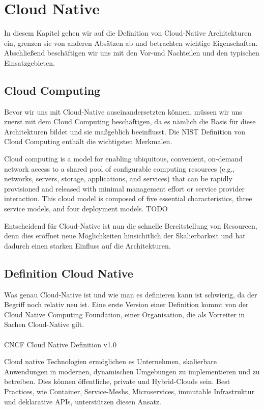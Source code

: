 \chapter{Cloud Native}

In diesem Kapitel gehen wir auf die Definition von Cloud-Native Architekturen ein, grenzen sie von anderen Absätzen ab und betrachten wichtige Eigenschaften. Abschließend beschäftigen wir uns mit den Vor-und Nachteilen und den typischen Einsatzgebieten.

\section{Cloud Computing}
Bevor wir uns mit Cloud-Native auseinandersetzten können, müssen wir uns zuerst mit dem Cloud Computing beschäftigen, da es nämlich die Basis für diese Architekturen bildet und sie maßgeblich beeinflusst. Die NIST Definition von Cloud Computing enthält die wichtigsten Merkmalen.

Cloud computing is a model for enabling ubiquitous, convenient, on-demand network access to a shared pool of configurable computing resources (e.g., networks, servers, storage, applications, and services) that can be rapidly provisioned and released with minimal management effort or service provider interaction. This cloud model is composed of five essential characteristics, three service models, and four deployment models. TODO

Entscheidend für Cloud-Native ist nun die schnelle Bereitstellung von Resourcen, denn dies eröffnet neue Möglichkeiten hinsichitlich der Skalierbarkeit und hat dadurch einen starken Einfluss auf die Architekturen.

\section{Definition Cloud Native}
Was genau Cloud-Native ist und wie man es definieren kann ist schwierig, da der Begriff noch relativ neu ist. Eine erste Version einer Definition kommt von der Cloud Native Computing Foundation, einer Organisation, die als Vorreiter in Sachen Cloud-Native gilt.\\
\\
CNCF Cloud Native Definition v1.0

Cloud native Technologien ermöglichen es Unternehmen, skalierbare Anwendungen in modernen, dynamischen Umgebungen zu implementieren und zu betreiben. Dies können öffentliche, private und Hybrid-Clouds sein. Best Practices, wie Container, Service-Meshs, Microservices, immutable Infrastruktur und deklarative APIs, unterstützen diesen Ansatz.

